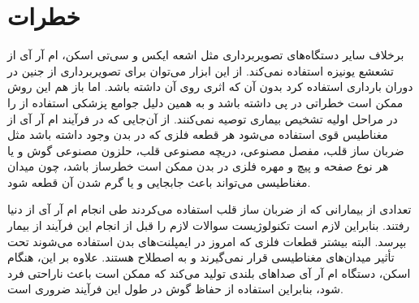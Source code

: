 \section{خطرات \mri}
برخلاف سایر دستگاه‌های تصویربرداری مثل اشعه ایکس و سی‌تی اسکن، ام آر آی از تشعشع یونیزه استفاده نمی‌کند. از این ابزار می‌توان برای تصویربرداری از جنین در دوران بارداری استفاده کرد بدون آن که اثری روی آن داشته باشد. اما باز هم این روش ممکن است خطراتی در پی داشته باشد و به همین دلیل جوامع پزشکی استفاده از \mri را در مراحل اولیه تشخیص بیماری توصیه نمی‌کنند. از آن‌جایی که در فرآیند ام آر آی از مغناطیس قوی استفاده می‌شود هر قطعه فلزی که در بدن وجود داشته باشد مثل ضربان ساز قلب، مفصل مصنوعی، دریچه مصنوعی قلب، حلزون مصنوعی گوش و یا هر نوع صفحه و پیچ و مهره فلزی در بدن ممکن است خطرساز باشد، چون میدان مغناطیسی می‌تواند باعث جابجایی و یا گرم شدن آن قطعه شود.

تعدادی از بیمارانی که از ضربان ساز قلب استفاده می‌کردند طی انجام ام آر آی از دنیا رفتند. بنابراین لازم است تکنولوژیست \mri سوالات لازم را قبل از انجام این فرآیند از بیمار بپرسد. البته بیشتر قطعات فلزی که امروز در ایمپلنت‌های بدن استفاده می‌شوند تحت تأثیر میدان‌های مغناطیسی قرار نمی‌گیرند و به اصطلاح
 هستند. علاوه بر این، هنگام اسکن، دستگاه ام آر آی صداهای بلندی تولید می‌کند که ممکن است باعث ناراحتی فرد شود، بنابراین استفاده از حفاظ گوش در طول این فرآیند ضروری است.




